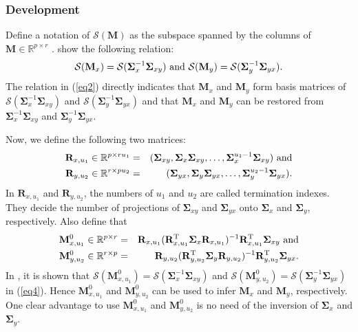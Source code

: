 \subsubsection{Development}
Define a notation of $\mathcal{S}(\mathbf{M})$ as
the subspace spanned by the columns of ${\mathbf{M}}\in{\mathbb{R}}^{p\times r}$ .
\cite{ccalm} show the following relation:
%
\begin{equation}\label{eq2}
  \mathcal{S}(\mathbf{M}_x)=
  \mathcal{S}(\boldsymbol{\Sigma}^{-1}_{x}\boldsymbol{\Sigma}_{xy})
  ~{\rm and}~
  \mathcal{S}(\mathbf{M}_y)=
  \mathcal{S}(\boldsymbol{\Sigma}^{-1}_{y}\boldsymbol{\Sigma}_{yx}).
\end{equation}
%
The relation in (\ref{eq2}) directly indicates that
$\mathbf{M}_x$ and $\mathbf{M}_y$ form basis matrices of
$\mathcal{S}(\boldsymbol{\Sigma}^{-1}_{x}\boldsymbol{\Sigma}_{xy})$ and
$\mathcal{S}(\boldsymbol{\Sigma}^{-1}_{y}\boldsymbol{\Sigma}_{yx})$
and that $\mathbf{M}_x$ and $\mathbf{M}_y$ can be restored from
$\boldsymbol{\Sigma}^{-1}_{x}\boldsymbol{\Sigma}_{xy}$ and
$\boldsymbol{\Sigma}^{-1}_{y}\boldsymbol{\Sigma}_{yx}$.

Now, we define the following two matrices:
%
\begin{eqnarray}
\nonumber \mathbf{R}_{x,u_1} \in\mathbb{R}^{p\times r u_1}
&=&({\boldsymbol{\Sigma}}_{xy},
{\boldsymbol{\Sigma}}_x{\boldsymbol{\Sigma}}_{xy},
\ldots, {\boldsymbol{\Sigma}}_x^{u_1 -1}{\boldsymbol{\Sigma}}_{xy})
~{\rm and} \\
\mathbf{R}_{y,u_2}  \in\mathbb{R}^{r\times p u_2}
&=& ({\boldsymbol{\Sigma}}_{yx},
{\boldsymbol{\Sigma}}_y{\boldsymbol{\Sigma}}_{yx},
\ldots, {\boldsymbol{\Sigma}}_y^{u_2 -1}{\boldsymbol{\Sigma}}_{yx}).
\label{eq3}
\end{eqnarray}
%
In $\mathbf{R}_{x,u_1}$ and $\mathbf{R}_{y,u_2}$, the numbers of $u_1$ and $u_2$
are called termination indexes. 
They decide the number of projections of
${\boldsymbol{\Sigma}}_{xy}$ and ${\boldsymbol{\Sigma}}_{yx}$
onto ${\boldsymbol{\Sigma}}_x$ and ${\boldsymbol{\Sigma}}_y$, respectively.
Also define that
%
\begin{eqnarray}
\nonumber{\mathbf{M}}_{x,u_1}^{0} \in \mathbb{R}^{p\times r}
&=& \mathbf{R}_{x,u_1}
(\mathbf{R}_{x,u_1}^{{\rm {T}}}{\boldsymbol{\Sigma}}_{x}
\mathbf{R}_{x,u_1})^{-1}\mathbf{R}_{x,u_1}^{{\rm {T}}}
{\boldsymbol{\Sigma}}_{xy} ~{\rm and}\\
{\mathbf{M}}_{y,u_2}^{0} \in \mathbb{R}^{r\times p}
&=&\mathbf{R}_{y,u_2}(\mathbf{R}_{y,u_2}^{{\rm {T}}}
{\boldsymbol{\Sigma}}_{y}
\mathbf{R}_{y,u_2})^{-1}\mathbf{R}_{y,u_2}^{{\rm {T}}}
{\boldsymbol{\Sigma}}_{yx}.
\label{eq4}
\end{eqnarray}
%
In \cite{seed}, it is shown that ${\mathcal{S}}({\mathbf{M}}_{x,u_1}^{0})
= {\mathcal{S}}(\boldsymbol{\Sigma}^{-1}_{x}\boldsymbol{\Sigma}_{xy})$
and ${\mathcal{S}}({\mathbf{M}}_{y,u_2}^{0})
= {\mathcal{S}}(\boldsymbol{\Sigma}^{-1}_{y}
\boldsymbol{\Sigma}_{yx})$ in (\ref{eq4}). 
Hence ${\mathbf{M}}_{x,u_1}^{0}$ and ${\mathbf{M}}_{y,u_2}^{0}$ can be used
to infer $\mathbf{M}_x$ and $\mathbf{M}_y$, respectively.
One clear advantage to use ${\mathbf{M}}_{x,u_1}^{0}$ and ${\mathbf{M}}_{y,u_2}^{0}$
is no need of the inversion of
$\boldsymbol{\Sigma}_x$ and  $\boldsymbol{\Sigma}_y$.

